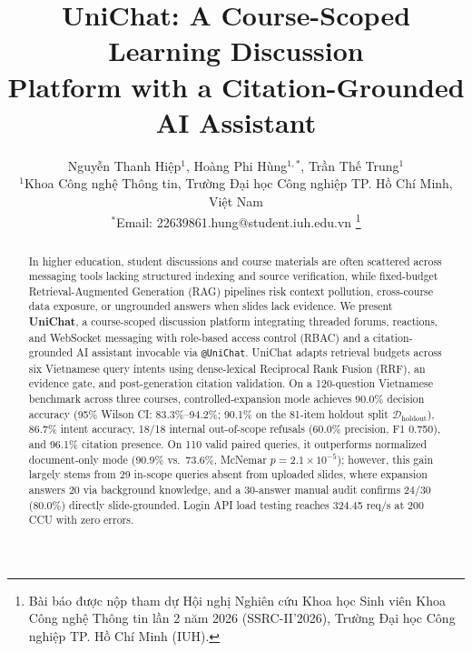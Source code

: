 \documentclass{IEEEtran}
\renewcommand{\abstractname}{Abstract}%
\renewcommand{\refname}{TÀI LIỆU THAM KHẢO}%
\begin{document}
\renewcommand{\abstractname}{Abstract}
\renewcommand{\refname}{TÀI LIỆU THAM KHẢO}

\title{UniChat: A Course-Scoped Learning Discussion \\ Platform with a Citation-Grounded AI Assistant}

\author{Nguyễn Thanh Hiệp$^{1}$, Hoàng Phi Hùng$^{1,*}$, Trần Thế Trung$^{1}$\\
\normalsize $^{1}$Khoa Công nghệ Thông tin, Trường Đại học Công nghiệp TP. Hồ Chí Minh, Việt Nam\\
\normalsize $^{*}$Email: 22639861.hung@student.iuh.edu.vn%
\thanks{Bài báo được nộp tham dự Hội nghị Nghiên cứu Khoa học Sinh viên Khoa Công nghệ Thông tin lần 2 năm 2026 (SSRC-II'2026), Trường Đại học Công nghiệp TP. Hồ Chí Minh (IUH).}%
}

\maketitle

\begin{abstract}
In higher education, student discussions and course materials are often scattered across messaging tools lacking structured indexing and source verification, while fixed-budget Retrieval-Augmented Generation (RAG) pipelines risk context pollution, cross-course data exposure, or ungrounded answers when slides lack evidence. We present \textbf{UniChat}, a course-scoped discussion platform integrating threaded forums, reactions, and WebSocket messaging with role-based access control (RBAC) and a citation-grounded AI assistant invocable via \texttt{@UniChat}. UniChat adapts retrieval budgets across six Vietnamese query intents using dense-lexical Reciprocal Rank Fusion (RRF), an evidence gate, and post-generation citation validation. On a 120-question Vietnamese benchmark across three courses, controlled-expansion mode achieves 90.0\% decision accuracy (95\% Wilson CI: 83.3\%--94.2\%; 90.1\% on the 81-item holdout split $\mathcal{D}_{\text{holdout}}$), 86.7\% intent accuracy, 18/18 internal out-of-scope refusals (60.0\% precision, F1 0.750), and 96.1\% citation presence. On 110 valid paired queries, it outperforms normalized document-only mode (90.9\% vs.\ 73.6\%, McNemar $p = 2.1 \times 10^{-5}$); however, this gain largely stems from 29 in-scope queries absent from uploaded slides, where expansion answers 20 via background knowledge, and a 30-answer manual audit confirms 24/30 (80.0\%) directly slide-grounded. Login API load testing reaches 324.45 req/s at 200 CCU with zero errors.
\end{abstract}
\end{document}
